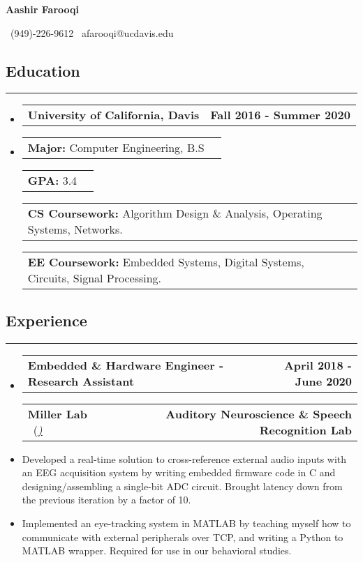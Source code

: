 \documentclass[10pt,letterpaper]{article}
\makeatletter
\newcommand{\items}[2]
{
	\begin{tabular*}{\linewidth}{l @{\extracolsep{\fill}} r}
		#1 & #2 \\
	\end{tabular*}
}
\newcommand{\header}[2]
{
	\begin{tabular*}{\linewidth}{l @{\extracolsep{\fill}} r}
		\hspace{-27pt} #1 & #2 \\
	\end{tabular*}
}
\newcommand{\sectionbreak}
{
	\vspace{-1.2em}
	\rule{\textwidth}{1.7pt}
	\vspace{-1.7em}
}
\makeatother
\begin{document}
\begin{center}
{\LARGE \textbf{Aashir Farooqi}}

\vspace{0.5em}
\ (949)-226-9612 \textbar 
\ afarooqi@ucdavis.edu\textbar
\ \href{https://github.com/AashPointO}{\emph{\underline{}}}
\\
\end{center}
\vspace{-20pt}


\subsection*{Education}
\sectionbreak

\begin{itemize}

\item[] 
	\header
		{\textbf{University of California, Davis}}
		{\textbf{Fall 2016 - Summer 2020}}
\item[]
	\vspace{-2.5pt}
	\items
		{\textbf{Major:} Computer Engineering, B.S}
		{}
	\items
		{\textbf{GPA:} 3.4}
		{}
	\items
		{\textbf{CS Coursework:} Algorithm Design \& Analysis, Operating Systems, Networks.}
		{}
	\items
		{\textbf{EE Coursework:} Embedded Systems, Digital Systems, Circuits, Signal Processing.}
		{}
{\vspace{-0.6em}}
	
\end{itemize}

\vspace{-24.65pt}

\subsection*{Experience}
\sectionbreak

\begin{itemize}
	\item[]
		\header
			{\textbf{Embedded \& Hardware Engineer - Research Assistant}} 
			{\textbf{April 2018 - June 2020}}
		\header
		{\textbf{Miller Lab} \ (\href{https://millerlab.faculty.ucdavis.edu}{\small \emph{\underline{\smash{millerlab.faculty.ucdavis.edu})}}} }
			{\textbf{Auditory Neuroscience \& Speech Recognition Lab}} 
		\item
			Developed a real-time solution to cross-reference external audio inputs with an EEG acquisition system
			by writing embedded firmware code in C and designing/assembling a single-bit ADC circuit. Brought latency down from the previous iteration by a factor of 10.
		\item 
			Implemented an eye-tracking system in MATLAB by teaching myself how to communicate with external peripherals over TCP, and writing a Python
			to MATLAB wrapper. Required for use in our behavioral studies.
\end{itemize}
\end{document}
